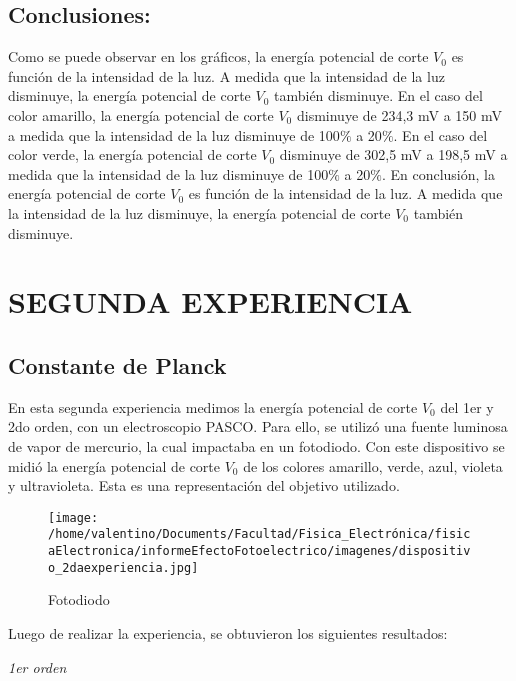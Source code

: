 \documentclass[a4paper]{article}
\begin{document}
        \subsection{Conclusiones:}
        \indent Como se puede observar en los gráficos, la energía potencial de corte $V_{0}$ es función de la intensidad de la luz. A medida que la intensidad de la luz disminuye, la energía potencial de corte $V_{0}$ también disminuye.
        \indent En el caso del color amarillo, la energía potencial de corte $V_{0}$ disminuye de 234,3 mV a 150 mV a medida que la intensidad de la luz disminuye de 100$\%$ a 20$\%$. En el caso del color verde, la energía potencial de corte $V_{0}$ disminuye de 302,5 mV a 198,5 mV a medida que la intensidad de la luz disminuye de 100$\%$ a 20$\%$.
        \indent En conclusión, la energía potencial de corte $V_{0}$ es función de la intensidad de la luz. A medida que la intensidad de la luz disminuye, la energía potencial de corte $V_{0}$ también disminuye.\\

    \section{SEGUNDA EXPERIENCIA}
      \subsection{Constante de Planck}
      \indent En esta segunda experiencia medimos la energía potencial de corte $V_{0}$ del 1er y 2do orden, con un electroscopio PASCO. Para ello, se utilizó una fuente luminosa de vapor de mercurio, la cual impactaba en un fotodiodo. Con este dispositivo se midió la energía potencial de corte $V_{0}$ de los colores amarillo, verde, azul, violeta y ultravioleta. Esta es una representación del objetivo utilizado.
      \vspace{0mm}

      \begin{figure}[h]
        \centering
        \texttt{[image: /home/valentino/Documents/Facultad/Fisica\_Electrónica/fisicaElectronica/informeEfectoFotoelectrico/imagenes/dispositivo\_2daexperiencia.jpg]}
        \caption{Fotodiodo}
      \end{figure}

      \indent Luego de realizar la experiencia, se obtuvieron los siguientes resultados:

      \begin{minipage}[c]{7.5cm}
        \vspace{5mm}
        \centering
        \textit{1er orden} 
        \vspace{2mm}
      \end{minipage}
\end{document}
